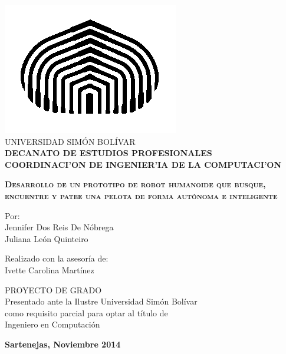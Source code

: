 \begin{titlepage}
\begin{center}

\includegraphics[scale=0.5,type=png,ext=.png,read=.png]{imagenes/cebolla} \\

\textsc {\large UNIVERSIDAD SIMÓN BOLÍVAR} \\
\textsc{\bfseries DECANATO DE ESTUDIOS PROFESIONALES\\
COORDINACI'ON DE INGENIER'IA DE LA COMPUTACI'ON}

\bigskip
\bigskip
\bigskip
\bigskip
\bigskip
\bigskip
\bigskip
\bigskip
\bigskip

\textsc{\bfseries Desarrollo de un prototipo de robot humanoide que busque, encuentre y patee una pelota de forma autónoma e inteligente}

\bigskip
\bigskip
\bigskip
\bigskip
\bigskip

\begin{minipage}{\textwidth}
\centering
Por: \\
Jennifer Dos Reis De Nóbrega \\ Juliana Le\'on Quinteiro\\

\bigskip
\bigskip
\bigskip

Realizado con la asesoría de: \\
Ivette Carolina Mart\'inez 
\end{minipage}

\bigskip
\bigskip
\bigskip
\bigskip
\bigskip
\bigskip
\bigskip
\bigskip
\bigskip

{PROYECTO DE GRADO \\ Presentado ante la Ilustre Universidad Simón Bolívar \\
como requisito parcial para optar al título de \\ Ingeniero en Computación} \\

\bigskip
\bigskip
\vfill

{\large \bfseries Sartenejas, 
Noviembre 2014}

\end{center}
\end{titlepage}

